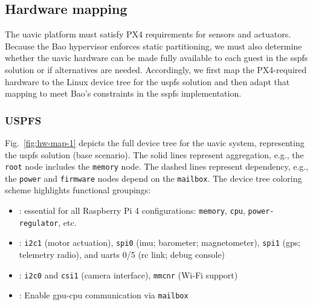 

\subsection{Hardware mapping}
\label{sec:hardware-mapping}
The \gls{uavic} platform must satisfy PX4 requirements for sensors and
actuators. Because the Bao hypervisor enforces static partitioning, we must also
determine whether the \gls{uavic} hardware can be made fully available to each
guest in the \gls{sspfs} solution or if alternatives are needed.
Accordingly, we first map the PX4-required hardware to the Linux device tree for
the \gls{uspfs} solution and then adapt that mapping to meet Bao’s constraints in the \gls{sspfs} implementation.

\subsubsection{USPFS}
\label{sec:base-scenario}
Fig.~\ref{fig:hw-map-1} depicts the full device tree for the \gls{uavic} system,
representing the \gls{uspfs} solution (base scenario).
The solid lines represent aggregation, e.g., the \lstinline{root} node includes the \lstinline{memory} node. The
dashed lines represent dependency, e.g., the \lstinline{power} and \lstinline{firmware} nodes depend on the \lstinline{mailbox}.
%
The device tree coloring scheme highlights functional groupings:
\begin{itemize}[noitemsep,topsep=0pt]
%
\item {}: essential for all Raspberry Pi
  4 configurations: \lstinline{memory}, \lstinline{cpu},
  \lstinline{power-regulator}, etc.
%
\item {}: \lstinline{i2c1} (motor
  actuation), \lstinline{spi0} (\gls{imu}; barometer; magnetometer),
  \lstinline{spi1} (\gls{gps}; telemetry radio), and \glspl{uart} 0/5 (\gls{rc}
  link; debug console)
%
\item {}: \lstinline{i2c0} and
  \lstinline{csi1} (camera interface), \lstinline{mmcnr} (Wi-Fi support)
%
\item {}: Enable \gls{gpu}-\gls{cpu} communication via \lstinline{mailbox}~\cite{rpi4-fw-mbox}
\end{itemize}

